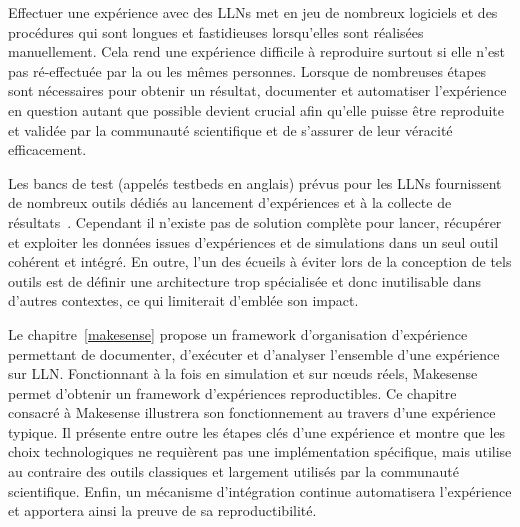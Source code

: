 
Effectuer une expérience avec des \ac{LLN}s met en jeu de nombreux logiciels et des procédures qui sont longues et fastidieuses lorsqu'elles sont réalisées manuellement.
Cela rend une expérience difficile à reproduire surtout si elle n'est pas ré-effectuée par la ou les mêmes personnes.
Lorsque de nombreuses étapes sont nécessaires pour obtenir un résultat, documenter et automatiser l'expérience en question autant que possible devient crucial afin qu'elle puisse être reproduite et validée par la communauté scientifique et de s'assurer de leur véracité efficacement.


Les bancs de test (appelés testbeds en anglais) prévus pour les \ac{LLN}s fournissent de nombreux outils dédiés au lancement d'expériences et à la collecte de résultats~\cite{buchert2015survey,fleury2015fit}.
Cependant il n'existe pas de solution complète pour lancer, récupérer et exploiter les données issues d'expériences et de simulations dans un seul outil cohérent et intégré.
En outre, l'un des écueils à éviter lors de la conception de tels outils est de définir une architecture trop spécialisée et donc inutilisable dans d'autres contextes, ce qui limiterait d'emblée son impact.


Le chapitre~\ref{makesense} propose un framework d'organisation d'expérience permettant de documenter, d'exécuter et d'analyser l'ensemble d'une expérience sur \ac{LLN}.
Fonctionnant à la fois en simulation et sur nœuds réels, Makesense permet d'obtenir un framework d'expériences reproductibles.
Ce chapitre consacré à Makesense illustrera son fonctionnement au travers d'une expérience typique.
Il présente entre outre les étapes clés d'une expérience et montre que les choix technologiques ne requièrent pas une implémentation spécifique, mais utilise au contraire des outils classiques et largement utilisés par la communauté scientifique.
Enfin, un mécanisme d'intégration continue automatisera l'expérience et apportera ainsi la preuve de sa reproductibilité.

